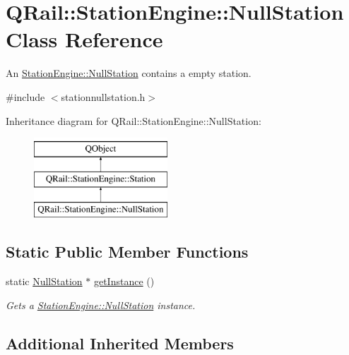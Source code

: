 \hypertarget{classQRail_1_1StationEngine_1_1NullStation}{}\section{Q\+Rail\+::Station\+Engine\+::Null\+Station Class Reference}
\label{classQRail_1_1StationEngine_1_1NullStation}


An \mbox{\hyperlink{classQRail_1_1StationEngine_1_1NullStation}{Station\+Engine\+::\+Null\+Station}} contains a empty station.  




{\ttfamily \#include $<$stationnullstation.\+h$>$}

Inheritance diagram for Q\+Rail\+::Station\+Engine\+::Null\+Station\+:\begin{figure}[H]
\begin{center}
\leavevmode
\includegraphics[height=3.000000cm]{classQRail_1_1StationEngine_1_1NullStation}
\end{center}
\end{figure}
\subsection*{Static Public Member Functions}
\begin{DoxyCompactItemize}
\item 
static \mbox{\hyperlink{classQRail_1_1StationEngine_1_1NullStation}{Null\+Station}} $\ast$ \mbox{\hyperlink{classQRail_1_1StationEngine_1_1NullStation_a620d1cc84bf91ad1c2cadf1f810c9832}{get\+Instance}} ()
\begin{DoxyCompactList}\small\item\em Gets a \mbox{\hyperlink{classQRail_1_1StationEngine_1_1NullStation}{Station\+Engine\+::\+Null\+Station}} instance. \end{DoxyCompactList}\end{DoxyCompactItemize}
\subsection*{Additional Inherited Members}


